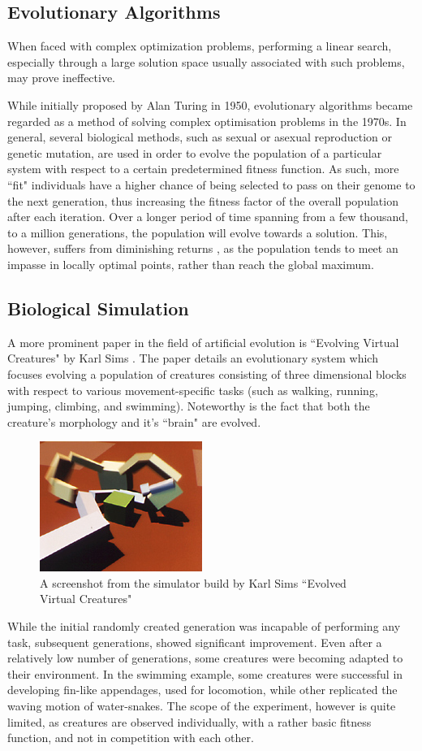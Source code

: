 \subsection{Evolutionary Algorithms}
When faced with complex optimization problems, performing a linear search, especially through a large solution space usually associated with such problems, may prove ineffective.

While initially proposed by Alan Turing in 1950, evolutionary algorithms became regarded as a method of solving complex optimisation problems in the 1970s. In general, several biological methods, such as sexual or asexual reproduction or genetic mutation, are used in order to evolve the population of a particular system with respect to a certain predetermined fitness function. As such, more ``fit" individuals have a higher chance of being selected to pass on their genome to the next generation, thus increasing the fitness factor of the overall population after each iteration. Over a longer period of time spanning from a few thousand, to a million generations, the population will evolve towards a solution. This, however, suffers from diminishing returns \cite{fumagalli2015speed}, as the population tends to meet an impasse in locally optimal points, rather than reach the global maximum.

\subsection{Biological Simulation}
A more prominent paper in the field of artificial evolution is ``Evolving Virtual Creatures" by Karl Sims \cite{sims1994evolving}. The paper details an evolutionary system which focuses evolving a population of creatures consisting of three dimensional blocks with respect to various movement-specific tasks (such as walking, running, jumping, climbing, and swimming). Noteworthy is the fact that both the creature's morphology and it's ``brain" are evolved.
\begin{figure}[!th]
	\centering
	\includegraphics[scale=1]{images/crabvsarm}
	\caption{A screenshot from the simulator build by Karl Sims ``Evolved Virtual Creatures"}
\end{figure}
While the initial randomly created generation was incapable of performing any task, subsequent generations, showed significant improvement. Even after a relatively low number of generations, some creatures were becoming adapted to their environment. In the swimming example, some creatures were successful in developing fin-like appendages, used for locomotion, while other replicated the waving motion of water-snakes. The scope of the experiment, however is quite limited, as creatures are observed individually, with a rather basic fitness function, and not in competition with each other.

